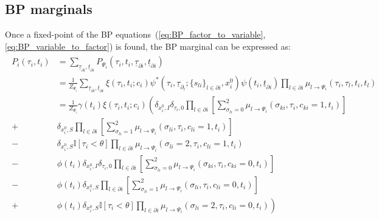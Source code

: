 \documentclass[a4paper, amsfonts, amssymb, amsmath, reprint, showkeys, nofootinbib, twoside, floatfix, pre,superscriptaddress, onecolumn]{revtex4-2}
\begin{document}
\subsection{BP marginals}
Once a fixed-point of the BP equations~(\ref{eq:BP_factor_to_variable},\ref{eq:BP_variable_to_factor}) is found, the BP marginal can be expressed as:
\begin{align}
\label{eq:BP_marginal}
\begin{aligned}
	P_i(\tau_i, t_i) &= \sum_{\underline{\tau}_{\partial i},\underline{t}_{\partial i}}P_{\Psi_i}(\tau_i, t_i, \underline{\tau}_{\partial i},\underline{t}_{\partial i}) \\
	&= \frac{1}{Z_{\Psi_i}}\sum_{\underline{\tau}_{\partial i},\underline{t}_{\partial i}}\xi(\tau_i, t_i;c_i)\psi^*(\tau_i, \underline{\tau}_{\partial_i};\{s_{li}\}_{l\in\partial i},x_i^0)\psi(t_i,\underline{t}_{\partial i})\prod_{l\in\partial i}\mu_{l\to\Psi_i}(\tau_i, \tau_l,t_i, t_l) \\
	&= \frac{1}{Z_{\Psi_i}}\gamma(t_i)\xi(\tau_i, t_i; c_i) \left(\delta_{x_i^0,I}\delta_{\tau_i,0}\prod_{l\in\partial i}\left[\sum_{\sigma_{li}=0}^2\mu_{l\to\Psi_i}(\sigma_{ki}, \tau_i, c_{ki}=1, t_i)\right]\right. \\
	+& \delta_{x_i^0,S}\prod_{l\in\partial i}\left[\sum_{\sigma_{li}=1}^2\mu_{l\to \Psi_i}(\sigma_{li}, \tau_i, c_{li}=1, t_i)\right] \\
	-& \delta_{x_i^0,S}\mathbb{I}[\tau_i<\theta]\prod_{l\in\partial i}\mu_{l\to \Psi_i}(\sigma_{li}=2, \tau_i, c_{li}=1, t_i) \\
	-&\phi(t_i)\delta_{x_i^0,I}\delta_{\tau_i,0}\prod_{l\in\partial i}\left[\sum_{\sigma_{li}=0}^2\mu_{l\to\Psi_i}(\sigma_{ki}, \tau_i, c_{ki}=0, t_i)\right]\\
	-&\phi(t_i)\delta_{x_i^0,S}\prod_{l\in\partial i}\left[\sum_{\sigma_{li}=1}^2\mu_{l\to \Psi_i}(\sigma_{li}, \tau_i, c_{li}=0, t_i)\right]\\
	+&\left.\phi(t_i) \delta_{x_i^0,S}\mathbb{I}[\tau_i<\theta]\prod_{l\in\partial i}\mu_{l\to \Psi_i}(\sigma_{li}=2, \tau_i, c_{li}=0, t_i)\right)
\end{aligned}
\end{align}
\end{document}
